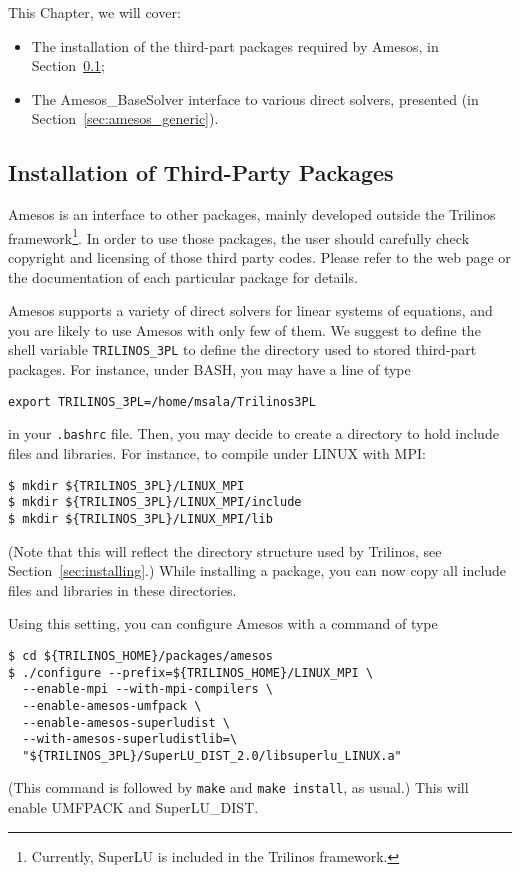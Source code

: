 This Chapter, we will cover:
\begin{itemize}
\item The installation of the third-part packages required by Amesos, in
  Section~\ref{sec:3pl};
\item The Amesos\_BaseSolver interface to various direct solvers,
  presented (in Section~\ref{sec:amesos_generic}).
\end{itemize}


\subsection{Installation of Third-Party Packages}
\label{sec:3pl}

Amesos is an interface to other packages, mainly developed outside the
Trilinos framework\footnote{Currently, SuperLU is included in the
  Trilinos framework.}. In order to use those packages, the user should
carefully check copyright and licensing of those third party codes.
Please refer to the web page or the documentation of each particular
package for details.

Amesos supports a variety of direct solvers for linear systems of
equations, and you are likely to use Amesos with only few of them. We
suggest to define the shell variable \verb!TRILINOS_3PL!  to define the
directory used to stored third-part packages. For instance, under BASH,
you may have a line of type
\begin{verbatim}
export TRILINOS_3PL=/home/msala/Trilinos3PL
\end{verbatim}
in your \verb!.bashrc! file. Then, you may decide to create a directory
to hold include files and libraries. For instance, to compile under
LINUX with MPI:
\begin{verbatim}
$ mkdir ${TRILINOS_3PL}/LINUX_MPI
$ mkdir ${TRILINOS_3PL}/LINUX_MPI/include
$ mkdir ${TRILINOS_3PL}/LINUX_MPI/lib
\end{verbatim}
(Note that this will reflect the directory structure used by Trilinos,
see Section~\ref{sec:installing}.) While installing a package, you can
now copy all include files and libraries in these directories.

Using this setting, you can configure Amesos with a command of type
\begin{verbatim}
$ cd ${TRILINOS_HOME}/packages/amesos
$ ./configure --prefix=${TRILINOS_HOME}/LINUX_MPI \
  --enable-mpi --with-mpi-compilers \
  --enable-amesos-umfpack \
  --enable-amesos-superludist \
  --with-amesos-superludistlib=\
  "${TRILINOS_3PL}/SuperLU_DIST_2.0/libsuperlu_LINUX.a"
\end{verbatim}
(This command is followed by \verb!make! and \verb!make install!, as
usual.)  This will enable UMFPACK and SuperLU\_DIST.

